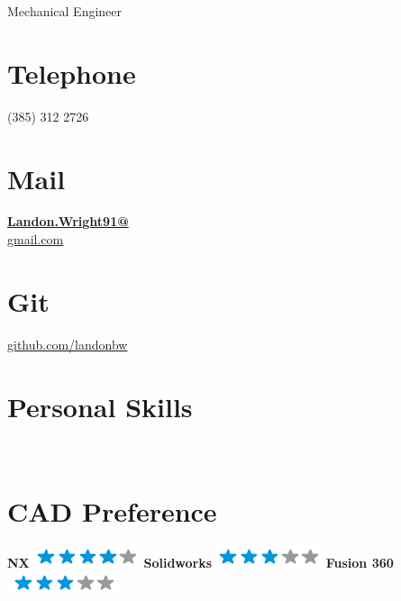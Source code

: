 \documentclass[]{friggeri-cv}
\begin{document}
      {Mechanical Engineer}

\begin{aside}
	\vspace{0.77 in}
  \section{Telephone}
    (385) 312 2726
    ~
  \section{Mail}
    \href{mailto:landon.Wright91+resume@Gmail.com}{\textbf{Landon.Wright91@}\\gmail.com}
    ~
  \section{Git}
    \href{https://github.com/landonbw}{github.com/landonbw}
  \section{Personal Skills}
    ~
    \section{CAD Preference}
    \textbf{NX}\includegraphics[scale=0.40]{img/4stars.png}
    \textbf{Solidworks}\includegraphics[scale=0.40]{img/3stars.png}
    \textbf{Fusion 360}\includegraphics[scale=0.40]{img/3stars.png}
    ~

\end{aside}
\end{document}
